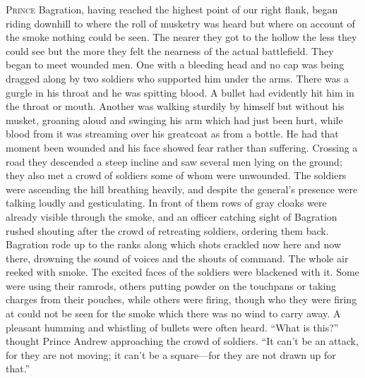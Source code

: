 \lettrine[lines=2, loversize=0.3, lraise=0]{\initfamily P}{rince}
Bagration, having reached the highest point of our right
flank, began riding downhill to where the roll of musketry was
heard but where on account of the smoke nothing could be
seen. The nearer they got to the hollow the less they could see
but the more they felt the nearness of the actual
battlefield. They began to meet wounded men. One with a bleeding
head and no cap was being dragged along by two soldiers who
supported him under the arms. There was a gurgle in his throat
and he was spitting blood. A bullet had evidently hit him in the
throat or mouth. Another was walking sturdily by himself but
without his musket, groaning aloud and swinging his arm which had
just been hurt, while blood from it was streaming over his
greatcoat as from a bottle. He had that moment been wounded and
his face showed fear rather than suffering.  Crossing a road they
descended a steep incline and saw several men lying on the
ground; they also met a crowd of soldiers some of whom were
unwounded. The soldiers were ascending the hill breathing
heavily, and despite the general's presence were talking loudly
and gesticulating. In front of them rows of gray cloaks were
already visible through the smoke, and an officer catching sight
of Bagration rushed shouting after the crowd of retreating
soldiers, ordering them back. Bagration rode up to the ranks
along which shots crackled now here and now there, drowning the
sound of voices and the shouts of command. The whole air reeked
with smoke. The excited faces of the soldiers were blackened with
it. Some were using their ramrods, others putting powder on the
touchpans or taking charges from their pouches, while others were
firing, though who they were firing at could not be seen for the
smoke which there was no wind to carry away. A pleasant humming
and whistling of bullets were often heard. ``What is this?''
thought Prince Andrew approaching the crowd of soldiers. ``It
can't be an attack, for they are not moving; it can't be a
square---for they are not drawn up for that.''

